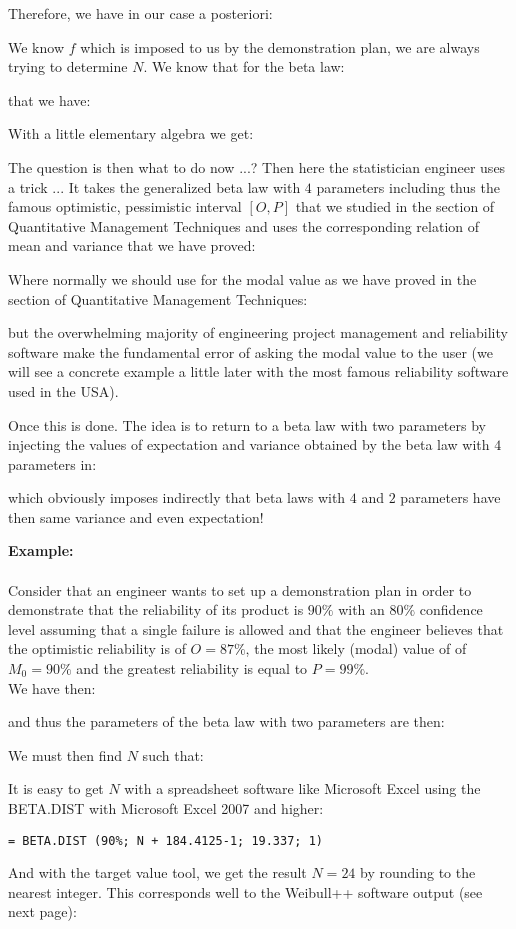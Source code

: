  	Therefore, we have in our case a posteriori:
	
 	We know $f$ which is imposed to us by the demonstration plan, we are always trying to determine $N$. We know that for the beta law:
	
 	that we have:
	
	With a little elementary algebra we get:
	
 	The question is then what to do now ...? Then here the statistician engineer uses a trick ... It takes the generalized beta law with $4$ parameters including thus the famous optimistic, pessimistic interval $[O, P]$ that we studied in the section of Quantitative Management Techniques and uses the corresponding relation of mean and variance that we have proved:
	
	Where normally we should use for the modal value as we have proved in the section of Quantitative Management Techniques:
	
	but the overwhelming majority of engineering project management and reliability software make the fundamental error of asking the modal value to the user (we will see a concrete example a little later with the most famous reliability software used in the USA).

	Once this is done. The idea is to return to a beta law with two parameters by injecting the values of expectation and variance obtained by the beta law with $4$ parameters in:
	
 	which obviously imposes indirectly that beta laws with $4$ and $2$ parameters have then same variance and even expectation!
	\begin{tcolorbox}[colframe=black,colback=white,sharp corners]
	\textbf{{\Large {}}Example:}\\\\
	Consider that an engineer wants to set up a demonstration plan in order to demonstrate that the reliability of its product is $90\%$ with an $80\%$ confidence level assuming that a single failure is allowed and that the engineer believes that the optimistic reliability is of $O=87\%$, the most likely (modal) value of of $M_0=90\%$ and the greatest reliability is equal to $P=99\%$.\\

	We have then:
	
	and thus the parameters of the beta law with two parameters are then:
	
	We must then find $N$ such that:
	
 	It is easy to get $N$ with a spreadsheet software like Microsoft Excel using the BETA.DIST with Microsoft Excel 2007 and higher:
	\begin{center}
	\texttt{= BETA.DIST (90\%; N + 184.4125-1; 19.337; 1)}
	\end{center}
	And with the target value tool, we get the result $N=24$ by rounding to the nearest integer. This corresponds well to the Weibull++ software output (see next page):\\
	\end{tcolorbox}
	
